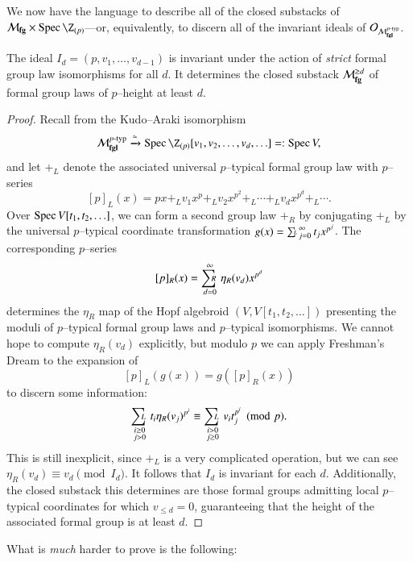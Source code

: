 We now have the language to describe all of the closed substacks of $\moduli{fg} \times \Spec \Z_{(p)}$---or, equivalently, to discern all of the invariant ideals of $\mathcal{O}_{\mathcal{M}_{\mathbf{fgl}}^{p\text{-}\mathrm{typ}}}$.

\begin{corollary}\label{IdIsAnInvariantIdeal}
The ideal $I_d = (p, v_1, \ldots, v_{d-1})$ is invariant under the action of \emph{strict} formal group law isomorphisms for all $d$.  It determines the closed substack $\mathcal{M}_{\mathbf{fg}}^{\ge d}$ of formal group laws of $p$--height at least $d$.
\end{corollary}
\begin{proof}
Recall from  the Kudo--Araki isomorphism \[\moduli{fgl}^{\ptyp} \xrightarrow{\simeq} \Spec \Z_{(p)}[v_1, v_2, \ldots, v_d, \ldots] =: \Spec V,\] and let $+_L$ denote the associated universal $p$--typical formal group law with $p$--series \[[p]_L(x) = px +_L v_1 x^p +_L v_2 x^{p^2} +_L \cdots +_L v_d x^{p^d} +_L \cdots.\]  Over $\operatorname{Spec} V[t_1, t_2, \ldots]$, we can form a second group law $+_R$ by conjugating $+_L$ by the universal $p$--typical coordinate transformation $g(x) = \sumfgl{L}_{j=0}^\infty t_j x^{p^j}$.  The corresponding $p$--series \[[p]_R(x) = \sumfgl{R}_{d=0}^\infty \eta_R(v_d) x^{p^d}\] determines the $\eta_R$ map of the Hopf algebroid $(V, V[t_1, t_2, \ldots])$ presenting the moduli of $p$--typical formal group laws and $p$--typical isomorphisms.  We cannot hope to compute $\eta_R(v_d)$ explicitly, but modulo $p$ we can apply Freshman's Dream to the expansion of \[[p]_L(g(x)) = g([p]_R(x))\] to discern some information: \[\sumfgl{L}_{\substack{i \ge 0 \\ j > 0}} t_i \eta_R(v_j)^{p^i} \equiv \sumfgl{L}_{\substack{i > 0 \\ j \ge 0}} v_i t_j^{p^i} \pmod p.\]  This is still inexplicit, since $+_L$ is a very complicated operation, but we can see $\eta_R(v_d) \equiv v_d \pmod{I_d}$.  It follows that $I_d$ is invariant for each $d$.  Additionally, the closed substack this determines are those formal groups admitting local $p$--typical coordinates for which $v_{\le d} = 0$, guaranteeing that the height of the associated formal group is at least $d$.
\end{proof}

\noindent What is \emph{much} harder to prove is the following:

